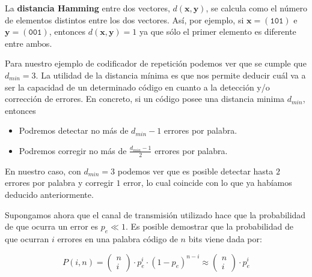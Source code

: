 \documentclass[es,apuntes]{uah}
\begin{document}
 La {\bf distancia Hamming} entre dos vectores, $d(\mathbf{x}, \mathbf{y})$, se calcula como el número de elementos distintos entre los dos vectores. Así, por ejemplo, si $\mathbf{x} = (\mathtt{1 0 1})$ e $\mathbf{y} = (\mathtt{0 0 1})$, entonces $d(\mathbf{x},\mathbf{y}) = 1$ ya que sólo el primer elemento es diferente entre ambos.  
 
 Para nuestro ejemplo de codificador de repetición podemos ver que se cumple que $d_{min} = 3$. La utilidad de la distancia mínima es que nos permite deducir cuál va a ser la capacidad de un determinado código en cuanto a la detección y/o corrección de errores. En concreto, si un código posee una distancia minima $d_{min}$, entonces

\begin{itemize}
	\item Podremos detectar no más de $d_{min}-1$ errores por palabra.
	\item Podremos corregir no más de $\frac{d_{min}-1}{2}$ errores por palabra.
\end{itemize} 

 En nuestro caso, con $d_{min}=3$ podemos ver que es posible detectar hasta $2$ errores por palabra y corregir $1$ error, lo cual coincide con lo que ya habíamos deducido anteriormente.
 
 Supongamos ahora que el canal de transmisión utilizado hace que la probabilidad de que ocurra un error es $p_e \ll 1$. Es posible demostrar que la probabilidad de que ocurran $i$ errores en una palabra código de $n$ bits viene dada por:
 
 \begin{displaymath}
 	P(i,n) = \left ( \begin{array}{c}n \\i \end{array} \right ) \cdot p_e^i \cdot \left ( 1 - p_e \right )^{n-i} \approx \left ( \begin{array}{c}n \\i \end{array} \right ) \cdot p_e^i
 \end{displaymath}
 
\end{document}
